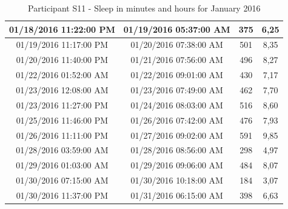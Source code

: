 \documentclass[12pt]{article} %
\begin{document}
\begin{table}[H]
\begin{footnotesize}
\begin{tabular}{| c | c | c | c |}
\hline
01/18/2016 11:22:00 PM & 01/19/2016 05:37:00 AM	& 375 & 6,25\\
\hline
01/19/2016 11:17:00 PM & 01/20/2016 07:38:00 AM	& 501 & 8,35\\
\hline
01/20/2016 11:40:00 PM & 01/21/2016 07:56:00 AM	& 496 & 8,27\\
\hline
01/22/2016 01:52:00 AM & 01/22/2016 09:01:00 AM	& 430 & 7,17\\
\hline
\colorbox{blue!20}{01/23/2016 12:08:00 AM} & \colorbox{blue!20}{01/23/2016 07:49:00 AM} & \colorbox{blue!20}{462} & \colorbox{blue!20}{7,70}\\
\hline
\colorbox{blue!20}{01/23/2016 11:27:00 PM} & \colorbox{blue!20}{01/24/2016 08:03:00 AM} & \colorbox{blue!20}{516} & \colorbox{blue!20}{8,60}\\
\hline
01/25/2016 11:46:00 PM & 01/26/2016 07:42:00 AM	& 476 & 7,93\\
\hline
01/26/2016 11:11:00 PM & 01/27/2016 09:02:00 AM	& 591 & 9,85\\
\hline
01/28/2016 03:59:00 AM & 01/28/2016 08:56:00 AM	& 298 & 4,97\\
\hline
01/29/2016 01:03:00 AM & 01/29/2016 09:06:00 AM	& 484 & 8,07\\
\hline
\colorbox{blue!20}{01/30/2016 07:15:00 AM} & \colorbox{blue!20}{01/30/2016 10:18:00 AM} & \colorbox{blue!20}{184} & \colorbox{blue!20}{3,07}\\
\hline
\colorbox{blue!20}{01/30/2016 11:37:00 PM} & \colorbox{blue!20}{01/31/2016 06:15:00 AM} & \colorbox{blue!20}{398} & \colorbox{blue!20}{6,63}\\
	\hline
	\end{tabular}
	\caption{Participant S11 - Sleep in minutes and hours for January 2016}
	\label{tab:S11JanPhone}
\end{footnotesize}
\end{table}
\end{document}
